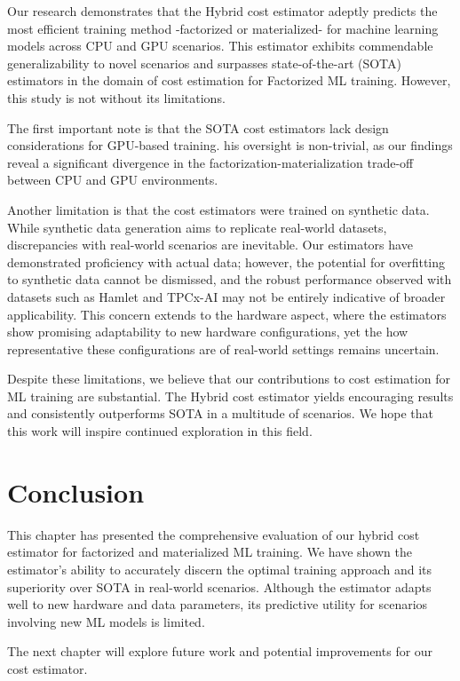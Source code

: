 Our research demonstrates that the Hybrid cost estimator adeptly predicts the most efficient training method -factorized or materialized- for machine learning models across CPU and GPU scenarios. This estimator exhibits commendable generalizability to novel scenarios and surpasses state-of-the-art (SOTA) estimators in the domain of cost estimation for Factorized ML training. However, this study is not without its limitations.

The first important note is that the SOTA cost estimators lack design considerations for GPU-based training. his oversight is non-trivial, as our findings reveal a significant divergence in the factorization-materialization trade-off between CPU and GPU environments.

Another limitation is that the cost estimators were trained on synthetic data. While synthetic data generation aims to replicate real-world datasets, discrepancies with real-world scenarios are inevitable.  Our estimators have demonstrated proficiency with actual data; however, the potential for overfitting to synthetic data cannot be dismissed, and the robust performance observed with datasets such as Hamlet and TPCx-AI may not be entirely indicative of broader applicability. This concern extends to the hardware aspect, where the estimators show promising adaptability to new hardware configurations, yet the how representative these configurations are of real-world settings remains uncertain.

Despite these limitations, we believe that our contributions to cost estimation for ML training are substantial. The Hybrid cost estimator yields encouraging results and consistently outperforms SOTA in a multitude of scenarios. We hope that this work will inspire continued exploration in this field.

\section{Conclusion}
\label{sec:eval-conclusion}
This chapter has presented the comprehensive evaluation of our hybrid cost estimator for factorized and materialized ML training. We have shown the estimator's ability to accurately discern the optimal training approach and its superiority over SOTA in real-world scenarios. Although the estimator adapts well to new hardware and data parameters, its predictive utility for scenarios involving new ML models is limited.

The next chapter will explore future work and potential improvements for our cost estimator.

